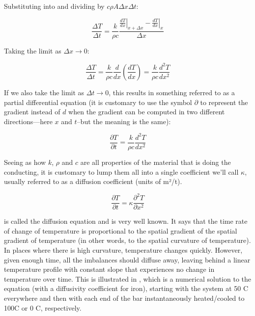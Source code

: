 Substituting into  and dividing by $c \rho A \Delta x \Delta t$:

\begin{equation} \label{eq:tempgradient} 
\frac{\Delta T}{\Delta t} =\frac{k}{\rho c}\frac{\left. \frac{dT}{dx}\right|_{x+\Delta x}-\left. \frac{dT}{dx}\right|_{x}}{\Delta x}
\end{equation}

Taking the limit as $\Delta x \rightarrow 0 $:

\begin{equation} \label{eq:secondderivative} 
\frac{\Delta T}{\Delta t}=\frac{k}{\rho c}\frac{d}{dx}\left ( \frac{dT}{dx} \right )=\frac{k}{\rho c}\frac{d^{2}T}{dx^2}
\end{equation}

If we also take the limit as $\Delta t \rightarrow 0$, this results in something referred to as a partial differential equation (it is customary to use the symbol $\partial$ to represent the gradient instead of $d$ when the gradient can be computed in two different directions—here $x$ and $t$--but the meaning is the same):

\begin{equation} \label{eq:diffusion1} 
\frac{\partial T}{\partial t}=\frac{k}{\rho c}\frac{d^{2}T}{dx^2} 
\end{equation}

Seeing as how $k$, $\rho$ and $c$ are all properties of the material that is doing the conducting, it is customary to lump them all into a single coefficient we’ll call $\kappa$, usually referred to as a diffusion coefficient (units of m²/t).  

\begin{equation} \label{eq:diffusion} 
\frac{\partial T}{\partial t}=\kappa \frac{\partial ^{2}T}{\partial x^2} 
\end{equation}

 is called the diffusion equation and is very well known.
It says that the time rate of change of temperature is proportional to the spatial gradient of the spatial gradient of temperature (in other words, to the spatial curvature of temperature).
In places where there is high curvature, temperature changes quickly.
However, given enough time, all the imbalances should diffuse away, leaving behind a linear temperature profile with constant slope that experiences no change in temperature over time.
This is illustrated in , which is a numerical solution to the equation (with a diffusivity coefficient for iron), starting with the system at 50 \textdegree C everywhere and then with each end of the bar instantaneously heated/cooled to 100\textdegree C or 0 \textdegree C, respectively.  

